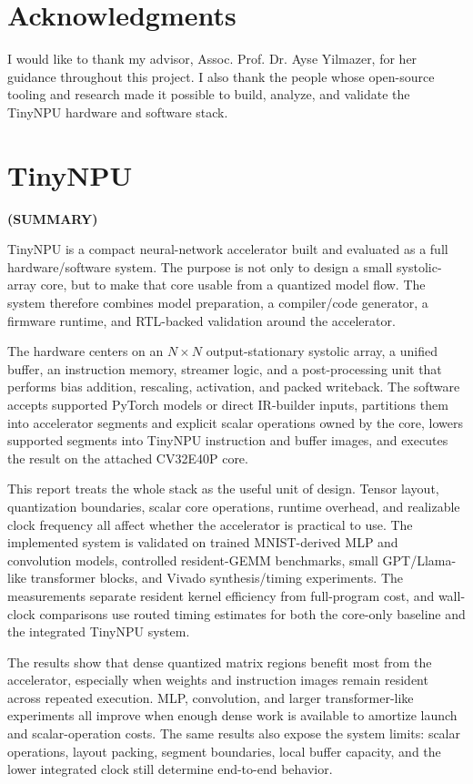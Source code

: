 \documentclass[a4paper, 12pt, titlepage]{article}
\newcommand{\thetitle}{TinyNPU}
\begin{document}
\newpage
\section*{Acknowledgments}
I would like to thank my advisor, Assoc. Prof. Dr. Ayse Yilmazer, for her guidance throughout this project. I also thank the people whose open-source tooling and research made it possible to build, analyze, and validate the TinyNPU hardware and software stack.

\newpage
\section*{\centering\thetitle}
\centerline{\fontsize{16pt}{21.6pt}\sffamily\bfseries (SUMMARY)}
TinyNPU is a compact neural-network accelerator built and evaluated as a full hardware/software system. The purpose is not only to design a small systolic-array core, but to make that core usable from a quantized model flow. The system therefore combines model preparation, a compiler/code generator, a firmware runtime, and RTL-backed validation around the accelerator.

The hardware centers on an $N \times N$ output-stationary systolic array, a unified buffer, an instruction memory, streamer logic, and a post-processing unit that performs bias addition, rescaling, activation, and packed writeback. The software accepts supported PyTorch models or direct IR-builder inputs, partitions them into accelerator segments and explicit scalar operations owned by the core, lowers supported segments into TinyNPU instruction and buffer images, and executes the result on the attached CV32E40P core.

This report treats the whole stack as the useful unit of design. Tensor layout, quantization boundaries, scalar core operations, runtime overhead, and realizable clock frequency all affect whether the accelerator is practical to use. The implemented system is validated on trained MNIST-derived MLP and convolution models, controlled resident-GEMM benchmarks, small GPT/Llama-like transformer blocks, and Vivado synthesis/timing experiments. The measurements separate resident kernel efficiency from full-program cost, and wall-clock comparisons use routed timing estimates for both the core-only baseline and the integrated TinyNPU system.

The results show that dense quantized matrix regions benefit most from the accelerator, especially when weights and instruction images remain resident across repeated execution. MLP, convolution, and larger transformer-like experiments all improve when enough dense work is available to amortize launch and scalar-operation costs. The same results also expose the system limits: scalar operations, layout packing, segment boundaries, local buffer capacity, and the lower integrated clock still determine end-to-end behavior.
\end{document}
